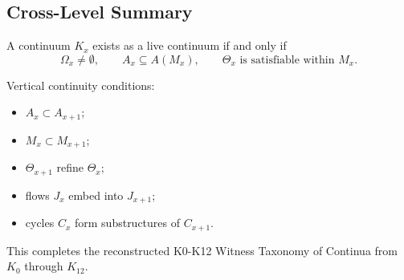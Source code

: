 \subsection{Cross-Level Summary}

A continuum \(K_x\) exists as a live continuum if and only if
\[
   \Omega_x \neq \emptyset,
   \qquad
   A_x \subseteq A(M_x),
   \qquad
   \Theta_x \text{ is satisfiable within } M_x.
\]

Vertical continuity conditions:
\begin{itemize}
    \item \(A_x \subset A_{x+1}\);
    \item \(M_x \subset M_{x+1}\);
    \item \(\Theta_{x+1}\) refine \(\Theta_x\);
    \item flows \(J_x\) embed into \(J_{x+1}\);
    \item cycles \(C_x\) form substructures of \(C_{x+1}\).
\end{itemize}

This completes the reconstructed K0-K12 Witness Taxonomy of Continua from
\(K_0\) through \(K_{12}\).
